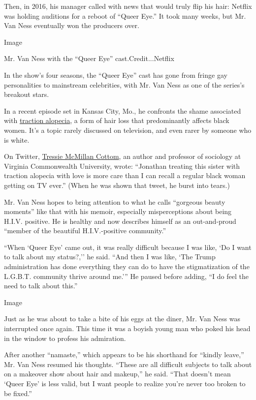 Then, in 2016, his manager called with news that would truly flip his
hair: Netflix was holding auditions for a reboot of ``Queer Eye.'' It
took many weeks, but Mr. Van Ness eventually won the producers over.

Image

Mr. Van Ness with the ``Queer Eye'' cast.Credit...Netflix

In the show's four seasons, the ``Queer Eye'' cast has gone from fringe
gay personalities to mainstream celebrities, with Mr. Van Ness as one of
the series's breakout stars.

In a recent episode set in Kansas City, Mo., he confronts the shame
associated with
\href{https://www.nytimes.com/2018/04/02/fashion/braids-weaves-extensions-and-traction-alopecia.html}{traction
alopecia}, a form of hair loss that predominantly affects black women.
It's a topic rarely discussed on television, and even rarer by someone
who is white.

On Twitter,
\href{https://twitter.com/tressiemcphd/status/1153144560324923392}{Tressie
McMillan Cottom}, an author and professor of sociology at Virginia
Commonwealth University, wrote: ``Jonathan treating this sister with
traction alopecia with love is more care than I can recall a regular
black woman getting on TV ever.'' (When he was shown that tweet, he
burst into tears.)

Mr. Van Ness hopes to bring attention to what he calls ``gorgeous beauty
moments'' like that with his memoir, especially misperceptions about
being H.I.V. positive. He is healthy and now describes himself as an
out-and-proud ``member of the beautiful H.I.V.-positive community.''

``When `Queer Eye' came out, it was really difficult because I was like,
`Do I want to talk about my status?,'' he said. ``And then I was like,
`The Trump administration has done everything they can do to have the
stigmatization of the L.G.B.T. community thrive around me.''' He paused
before adding, ``I do feel the need to talk about this.''

Image

Just as he was about to take a bite of his eggs at the diner, Mr. Van
Ness was interrupted once again. This time it was a boyish young man who
poked his head in the window to profess his admiration.

After another ``namaste,'' which appears to be his shorthand for
``kindly leave,'' Mr. Van Ness resumed his thoughts. ``These are all
difficult subjects to talk about on a makeover show about hair and
makeup,'' he said. ``That doesn't mean `Queer Eye' is less valid, but I
want people to realize you're never too broken to be fixed.''

